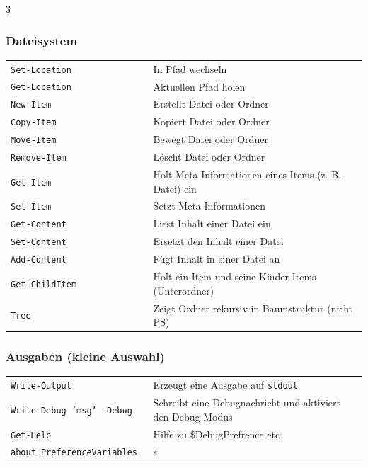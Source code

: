\documentclass[
11pt,
footheight=40pt
]{scrartcl}
\newif\ifexcitingstuff \excitingstufftrue
\begin{document}
\begin{paracol}{3}
	\subsubsection*{Dateisystem}
	\begin{tabular}{p{0.4\linewidth} p{0.6\linewidth}}
	    \rowcolor{lightpink} \texttt{Set-Location} & In Pfad wechseln \\
	    \texttt{Get-Location} & Aktuellen Pfad holen \\
	    \rowcolor{lightpink} \texttt{New-Item} & Erstellt Datei oder Ordner \\
	    \texttt{Copy-Item} & Kopiert Datei oder Ordner \\
	    \rowcolor{lightpink} \texttt{Move-Item} & Bewegt Datei oder Ordner \\
	    \texttt{Remove-Item} & Löscht Datei oder Ordner \\
	    \rowcolor{lightpink} \texttt{Get-Item} & Holt Meta-Informationen eines Items (z. B. Datei) ein\\
	    \texttt{Set-Item} & Setzt Meta-Informationen\\
	    \rowcolor{lightpink} \texttt{Get-Content} & Liest Inhalt einer Datei ein\\
	    \texttt{Set-Content} & Ersetzt den Inhalt einer Datei \\
	    \rowcolor{lightpink} \texttt{Add-Content} & Fügt Inhalt in einer Datei an\\
	    \texttt{Get-ChildItem} & Holt ein Item und seine Kinder-Items (Unterordner)\\
	    \rowcolor{lightpink} \texttt{Tree} & Zeigt Ordner rekursiv in Baumstruktur (nicht PS)\\
	\end{tabular}
	\fi
	
	\ifexcitingstuff 
	\subsubsection*{Ausgaben (kleine Auswahl)}
	\begin{tabular}{p{0.4\linewidth} p{0.6\linewidth}}
	    \texttt{Write-Output} & Erzeugt eine Ausgabe auf \texttt{stdout} \\
	    \rowcolor{lightpink} \texttt{Write-Debug 'msg' -Debug} & Schreibt eine Debugnachricht und aktiviert den Debug-Modus \\
	    \texttt{Get-Help}	     & Hilfe zu \$DebugPrefrence etc. \\
	    \texttt{about\_PreferenceVariables} & s\\
	\end{tabular}
	\fi
	

\end{paracol}
\end{document}
